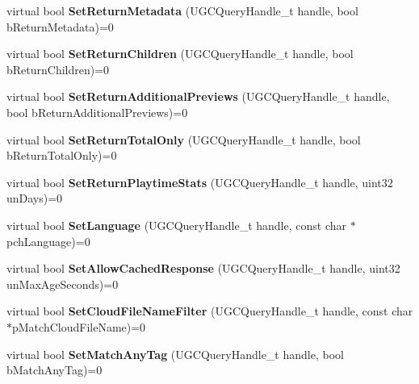 \begin{DoxyCompactItemize}
virtual bool {\bfseries Set\+Return\+Metadata} (U\+G\+C\+Query\+Handle\+\_\+t handle, bool b\+Return\+Metadata)=0
\item 
\mbox{\label{class_i_steam_u_g_c_abf26bae1e891aacc62f24791c8ba4544}} 
virtual bool {\bfseries Set\+Return\+Children} (U\+G\+C\+Query\+Handle\+\_\+t handle, bool b\+Return\+Children)=0
\item 
\mbox{\label{class_i_steam_u_g_c_af98edfb1b11036ac2fff38b8b3df0fed}} 
virtual bool {\bfseries Set\+Return\+Additional\+Previews} (U\+G\+C\+Query\+Handle\+\_\+t handle, bool b\+Return\+Additional\+Previews)=0
\item 
\mbox{\label{class_i_steam_u_g_c_a15c09b0b9caa320897080ae9eb624275}} 
virtual bool {\bfseries Set\+Return\+Total\+Only} (U\+G\+C\+Query\+Handle\+\_\+t handle, bool b\+Return\+Total\+Only)=0
\item 
\mbox{\label{class_i_steam_u_g_c_a42b242b06c06cbb24b2c5904a28852be}} 
virtual bool {\bfseries Set\+Return\+Playtime\+Stats} (U\+G\+C\+Query\+Handle\+\_\+t handle, uint32 un\+Days)=0
\item 
\mbox{\label{class_i_steam_u_g_c_aea7606518df5ea1f1a94755b23849821}} 
virtual bool {\bfseries Set\+Language} (U\+G\+C\+Query\+Handle\+\_\+t handle, const char $\ast$pch\+Language)=0
\item 
\mbox{\label{class_i_steam_u_g_c_af213273049e39eb92cbaf633c3467afe}} 
virtual bool {\bfseries Set\+Allow\+Cached\+Response} (U\+G\+C\+Query\+Handle\+\_\+t handle, uint32 un\+Max\+Age\+Seconds)=0
\item 
\mbox{\label{class_i_steam_u_g_c_adee0967c96cc09064eb1a385cb7183cf}} 
virtual bool {\bfseries Set\+Cloud\+File\+Name\+Filter} (U\+G\+C\+Query\+Handle\+\_\+t handle, const char $\ast$p\+Match\+Cloud\+File\+Name)=0
\item 
\mbox{\label{class_i_steam_u_g_c_a2c2ff75b522ef2a757bf62cabf02dd15}} 
virtual bool {\bfseries Set\+Match\+Any\+Tag} (U\+G\+C\+Query\+Handle\+\_\+t handle, bool b\+Match\+Any\+Tag)=0
\item 

\end{DoxyCompactItemize}
